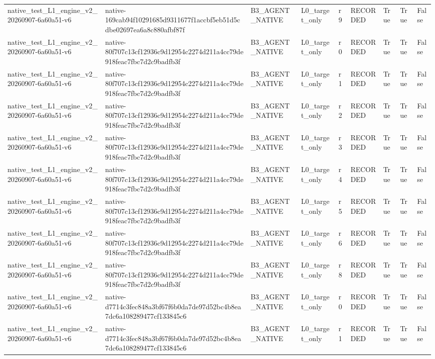 \begin{tabular}{lllllllll}
native\_test\_L1\_engine\_v2\_20260907-6a60a51-v6 & native-169cab94f10291685d9311677f1accbf5eb51d5cdbe02697ea6a8c880afbf87f & B3\_AGENT\_NATIVE & L0\_target\_only & r9 & RECORDED & True & True & False \\
native\_test\_L1\_engine\_v2\_20260907-6a60a51-v6 & native-80f707c13cf12936c9d12954c2274d211a4cc79de918feac7fbc7d2c9badfb3f & B3\_AGENT\_NATIVE & L0\_target\_only & r0 & RECORDED & True & True & False \\
native\_test\_L1\_engine\_v2\_20260907-6a60a51-v6 & native-80f707c13cf12936c9d12954c2274d211a4cc79de918feac7fbc7d2c9badfb3f & B3\_AGENT\_NATIVE & L0\_target\_only & r1 & RECORDED & True & True & False \\
native\_test\_L1\_engine\_v2\_20260907-6a60a51-v6 & native-80f707c13cf12936c9d12954c2274d211a4cc79de918feac7fbc7d2c9badfb3f & B3\_AGENT\_NATIVE & L0\_target\_only & r2 & RECORDED & True & True & False \\
native\_test\_L1\_engine\_v2\_20260907-6a60a51-v6 & native-80f707c13cf12936c9d12954c2274d211a4cc79de918feac7fbc7d2c9badfb3f & B3\_AGENT\_NATIVE & L0\_target\_only & r3 & RECORDED & True & True & False \\
native\_test\_L1\_engine\_v2\_20260907-6a60a51-v6 & native-80f707c13cf12936c9d12954c2274d211a4cc79de918feac7fbc7d2c9badfb3f & B3\_AGENT\_NATIVE & L0\_target\_only & r4 & RECORDED & True & True & False \\
native\_test\_L1\_engine\_v2\_20260907-6a60a51-v6 & native-80f707c13cf12936c9d12954c2274d211a4cc79de918feac7fbc7d2c9badfb3f & B3\_AGENT\_NATIVE & L0\_target\_only & r5 & RECORDED & True & True & False \\
native\_test\_L1\_engine\_v2\_20260907-6a60a51-v6 & native-80f707c13cf12936c9d12954c2274d211a4cc79de918feac7fbc7d2c9badfb3f & B3\_AGENT\_NATIVE & L0\_target\_only & r6 & RECORDED & True & True & False \\
native\_test\_L1\_engine\_v2\_20260907-6a60a51-v6 & native-80f707c13cf12936c9d12954c2274d211a4cc79de918feac7fbc7d2c9badfb3f & B3\_AGENT\_NATIVE & L0\_target\_only & r8 & RECORDED & True & True & False \\
native\_test\_L1\_engine\_v2\_20260907-6a60a51-v6 & native-d7714c3fec848a3bf67f6b0da7de97d52bc4b8ea7dc6a108289477cf133845c6 & B3\_AGENT\_NATIVE & L0\_target\_only & r0 & RECORDED & True & True & False \\
native\_test\_L1\_engine\_v2\_20260907-6a60a51-v6 & native-d7714c3fec848a3bf67f6b0da7de97d52bc4b8ea7dc6a108289477cf133845c6 & B3\_AGENT\_NATIVE & L0\_target\_only & r1 & RECORDED & True & True & False \\

\end{tabular}
